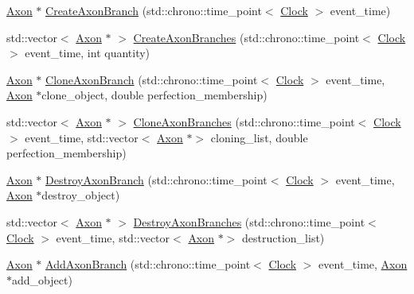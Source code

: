 \begin{DoxyCompactItemize}
\item 
\mbox{\hyperlink{classAxon}{Axon}} $\ast$ \mbox{\hyperlink{classAxon_a41e97ead4c793003db2de87061574c26}{Create\+Axon\+Branch}} (std\+::chrono\+::time\+\_\+point$<$ \mbox{\hyperlink{universe_8h_a0ef8d951d1ca5ab3cfaf7ab4c7a6fd80}{Clock}} $>$ event\+\_\+time)
\item 
std\+::vector$<$ \mbox{\hyperlink{classAxon}{Axon}} $\ast$ $>$ \mbox{\hyperlink{classAxon_ab0da51c05a0879efdb45c594b68ef8fd}{Create\+Axon\+Branches}} (std\+::chrono\+::time\+\_\+point$<$ \mbox{\hyperlink{universe_8h_a0ef8d951d1ca5ab3cfaf7ab4c7a6fd80}{Clock}} $>$ event\+\_\+time, int quantity)
\item 
\mbox{\hyperlink{classAxon}{Axon}} $\ast$ \mbox{\hyperlink{classAxon_a7720ee66a75e87f4e308b82d1841443a}{Clone\+Axon\+Branch}} (std\+::chrono\+::time\+\_\+point$<$ \mbox{\hyperlink{universe_8h_a0ef8d951d1ca5ab3cfaf7ab4c7a6fd80}{Clock}} $>$ event\+\_\+time, \mbox{\hyperlink{classAxon}{Axon}} $\ast$clone\+\_\+object, double perfection\+\_\+membership)
\item 
std\+::vector$<$ \mbox{\hyperlink{classAxon}{Axon}} $\ast$ $>$ \mbox{\hyperlink{classAxon_af2d6d5bc9ee0cd8ff654a949ef1cc294}{Clone\+Axon\+Branches}} (std\+::chrono\+::time\+\_\+point$<$ \mbox{\hyperlink{universe_8h_a0ef8d951d1ca5ab3cfaf7ab4c7a6fd80}{Clock}} $>$ event\+\_\+time, std\+::vector$<$ \mbox{\hyperlink{classAxon}{Axon}} $\ast$$>$ cloning\+\_\+list, double perfection\+\_\+membership)
\item 
\mbox{\hyperlink{classAxon}{Axon}} $\ast$ \mbox{\hyperlink{classAxon_a6ac580e4565d24c955b0a48d7a8b20e2}{Destroy\+Axon\+Branch}} (std\+::chrono\+::time\+\_\+point$<$ \mbox{\hyperlink{universe_8h_a0ef8d951d1ca5ab3cfaf7ab4c7a6fd80}{Clock}} $>$ event\+\_\+time, \mbox{\hyperlink{classAxon}{Axon}} $\ast$destroy\+\_\+object)
\item 
std\+::vector$<$ \mbox{\hyperlink{classAxon}{Axon}} $\ast$ $>$ \mbox{\hyperlink{classAxon_aa9d26eed8d178527d1995adfad2f67ac}{Destroy\+Axon\+Branches}} (std\+::chrono\+::time\+\_\+point$<$ \mbox{\hyperlink{universe_8h_a0ef8d951d1ca5ab3cfaf7ab4c7a6fd80}{Clock}} $>$ event\+\_\+time, std\+::vector$<$ \mbox{\hyperlink{classAxon}{Axon}} $\ast$$>$ destruction\+\_\+list)
\item 
\mbox{\hyperlink{classAxon}{Axon}} $\ast$ \mbox{\hyperlink{classAxon_a6ed85466115dab46ef71f26a420249ff}{Add\+Axon\+Branch}} (std\+::chrono\+::time\+\_\+point$<$ \mbox{\hyperlink{universe_8h_a0ef8d951d1ca5ab3cfaf7ab4c7a6fd80}{Clock}} $>$ event\+\_\+time, \mbox{\hyperlink{classAxon}{Axon}} $\ast$add\+\_\+object)

\end{DoxyCompactItemize}
